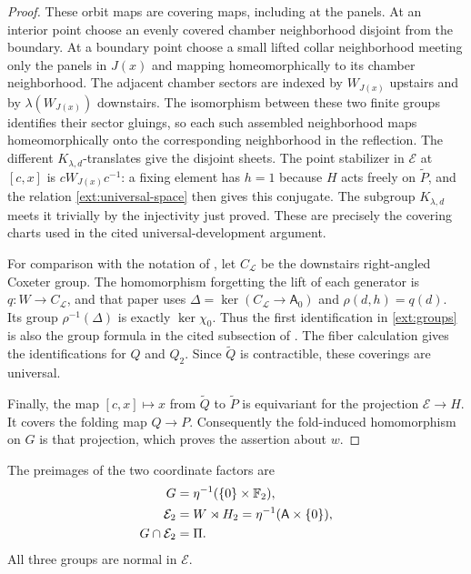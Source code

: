\begin{proof}
These orbit maps are covering maps, including at the panels.
At an interior point choose an evenly covered chamber
neighborhood disjoint from the boundary.  At a boundary point
choose a small lifted collar neighborhood meeting only the panels
in $J(x)$ and mapping homeomorphically to its chamber
neighborhood.  The adjacent chamber sectors are indexed by
$W_{J(x)}$ upstairs and by $\lambda(W_{J(x)})$ downstairs.
The isomorphism between these two finite groups identifies their
sector gluings, so each such assembled neighborhood maps
homeomorphically onto the corresponding neighborhood in the
reflection.  The different $K_{\lambda,d}$-translates give the disjoint
sheets.  The point stabilizer in $\mathcal E$ at
$[c,x]$ is $cW_{J(x)}c^{-1}$: a fixing element has $h=1$ because
$H$ acts freely on $\widetilde P$, and the relation
\eqref{ext:universal-space} then gives this conjugate.  The subgroup
$K_{\lambda,d}$ meets it trivially by the injectivity just proved.
These are precisely the covering charts used in the cited
universal-development argument.

For comparison with the notation of \cite{PD}, let
$C_{\mathcal L}$ be the downstairs right-angled Coxeter group.
The homomorphism forgetting the lift of each generator is
$q\colon W\to C_{\mathcal L}$, and that paper uses
$\Delta=\ker(C_{\mathcal L}\to\mathsf A_0)$ and
$\rho(d,h)=q(d)$.  Its group $\rho^{-1}(\Delta)$ is exactly
$\ker\chi_0$.  Thus the first identification in
\eqref{ext:groups} is also the group formula in the cited
subsection of \cite{PD}.  The fiber calculation gives the
identifications for $Q$ and $Q_2$.  Since $\widetilde Q$ is
contractible, these coverings are universal.

Finally, the map $[c,x]\mapsto x$ from $\widetilde Q$ to
$\widetilde P$ is equivariant for the projection
$\mathcal E\to H$.  It covers the folding map $Q\to P$.
Consequently the fold-induced homomorphism on $G$ is that
projection, which proves the assertion about $w$.
\end{proof}

The preimages of the two coordinate factors are
\begin{equation}\label{ext:e2}
 \begin{aligned}
 G&=\eta^{-1}(\{0\}\times\mathbb F_2),\\
 \mathcal E_2&=W\rtimes H_2
   =\eta^{-1}(\mathsf A\times\{0\}),\\
 G\cap\mathcal E_2&=\Pi.
 \end{aligned}
\end{equation}
All three groups are normal in $\mathcal E$.

